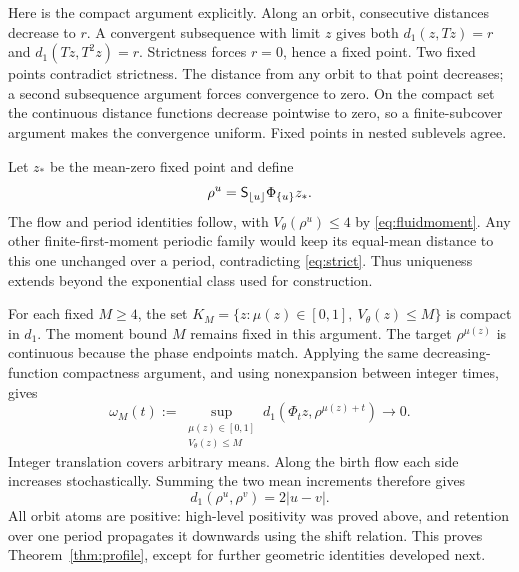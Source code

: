 Here is the compact argument explicitly. Along an orbit, consecutive distances decrease to $r$. A convergent subsequence with limit $z$ gives both $d_1(z,Tz)=r$ and $d_1(Tz,T^2z)=r$. Strictness forces $r=0$, hence a fixed point. Two fixed points contradict strictness. The distance from any orbit to that point decreases; a second subsequence argument forces convergence to zero. On the compact set the continuous distance functions decrease pointwise to zero, so a finite-subcover argument makes the convergence uniform. Fixed points in nested sublevels agree.

Let $z_*$ be the mean-zero fixed point and define
\[
 \rho^u=\mathsf S_{\lfloor u\rfloor}\Phi_{\{u\}}z_*.
\]
The flow and period identities follow, with $V_\theta(\rho^u)\le4$ by \eqref{eq:fluidmoment}. Any other finite-first-moment periodic family would keep its equal-mean distance to this one unchanged over a period, contradicting \eqref{eq:strict}. Thus uniqueness extends beyond the exponential class used for construction.

For each fixed $M\ge4$, the set $K_M=\{z:\mu(z)\in[0,1],\ V_\theta(z)\le M\}$ is compact in $d_1$. The moment bound $M$ remains fixed in this argument. The target $\rho^{\mu(z)}$ is continuous because the phase endpoints match. Applying the same decreasing-function compactness argument, and using nonexpansion between integer times, gives
\begin{equation}\label{eq:omega}
 \omega_M(t):=\sup_{\substack{\mu(z)\in[0,1]\\V_\theta(z)\le M}}
 d_1(\Phi_tz,\rho^{\mu(z)+t})\longrightarrow0.
\end{equation}
Integer translation covers arbitrary means. Along the birth flow each side increases stochastically. Summing the two mean increments therefore gives
\begin{equation}\label{eq:geometry}
 d_1(\rho^u,\rho^v)=2|u-v|.
\end{equation}
All orbit atoms are positive: high-level positivity was proved above, and retention over one period propagates it downwards using the shift relation. This proves Theorem~\ref{thm:profile}, except for further geometric identities developed next.

